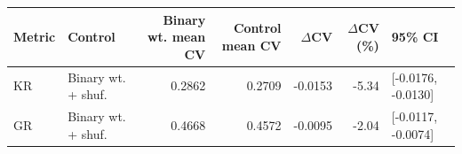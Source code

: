 \begin{tabular}{llrrrrl}
\toprule
Metric & Control & Binary wt. mean CV & Control mean CV & $\Delta$CV & $\Delta$CV (\%) & 95\% CI \\
\midrule
KR & Binary wt. + shuf. & 0.2862 & 0.2709 & -0.0153 & -5.34 & [-0.0176, -0.0130] \\
GR & Binary wt. + shuf. & 0.4668 & 0.4572 & -0.0095 & -2.04 & [-0.0117, -0.0074] \\
\bottomrule
\end{tabular}

